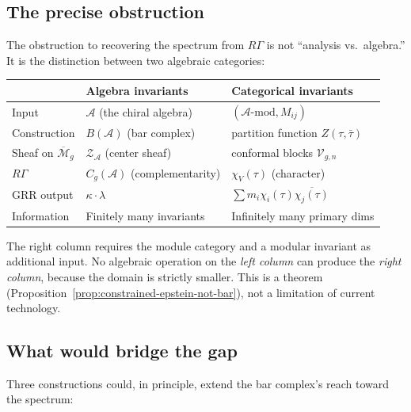 \documentclass[11pt]{article}
\newcommand{\cA}{\mathcal{A}}
\newcommand{\cM}{\mathcal{M}}
\newcommand{\cZ}{\mathcal{Z}}
\newcommand{\cV}{\mathcal{V}}
\begin{document}
\subsection{The precise obstruction}

The obstruction to recovering the spectrum from $R\Gamma$ is not
``analysis vs.\ algebra.''  It is the distinction between two
algebraic categories:

\begin{center}
\small
\renewcommand{\arraystretch}{1.3}
\begin{tabular}{@{}lll@{}}
& \textbf{Algebra invariants} & \textbf{Categorical invariants} \\
\hline
Input & $\cA$ (the chiral algebra) & $(\cA\text{-}\mathrm{mod}, M_{ij})$ \\
Construction & $B(\cA)$ (bar complex) & partition function $Z(\tau,\bar\tau)$ \\
Sheaf on $\overline{\cM}_g$ & $\cZ_\cA$ (center sheaf) & conformal blocks $\cV_{g,n}$ \\
$R\Gamma$ & $C_g(\cA)$ (complementarity) & $\chi_V(\tau)$ (character) \\
GRR output & $\kappa \cdot \lambda$ & $\sum m_i \chi_i(\tau)\overline{\chi_j(\tau)}$ \\
Information & Finitely many invariants & Infinitely many primary dims
\end{tabular}
\end{center}

\medskip

The right column requires the module category and a modular
invariant as additional input.  No algebraic operation on the
\emph{left column} can produce the \emph{right column}, because
the domain is strictly smaller.  This is a theorem
(Proposition~\ref{prop:constrained-epstein-not-bar}), not a
limitation of current technology.

\subsection{What would bridge the gap}

Three constructions could, in principle, extend the bar complex's
reach toward the spectrum:
\end{document}

